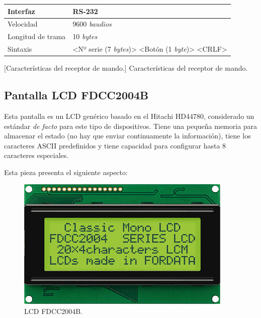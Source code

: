 \smallskip

\begin{center}
	\begin{tabular}{|l|l|}
		\hline Interfaz & RS-232 \\
		\hline Velocidad & 9600 \textit{baudios} \\ 
		\hline Longitud de trama & 10 \textit{bytes} \\ 
		\hline Sintaxis & <Nº serie (7 \textit{bytes})> <Botón (1 \textit{byte})> <CRLF> \\ 
		\hline 
	\end{tabular}
	\smallskip
	[Características del receptor de mando.]{\label{tab:info_recv} Características del receptor de mando. \cite{datasheet_decoder}}
\end{center}

\smallskip

\subsection{Pantalla LCD FDCC2004B}

Esta pantalla es un LCD genérico basado en el Hitachi HD44780, considerado un estándar \textit{de facto} para este tipo de dispositivos. Tiene una pequeña memoria para almacenar el estado (no hay que enviar continuamente la información), tiene los caracteres ASCII predefinidos y tiene capacidad para configurar hasta 8 caracteres especiales.

Esta pieza presenta el siguiente aspecto:

\smallskip

\begin{figure}[H]
	\noindent \begin{centering}
		\includegraphics[width=\linewidth/2]{capitulo3/FDCC2004B}
		\par\end{centering}
	\smallskip
	\caption{\label{fig:FDCC2004B} LCD FDCC2004B.}
\end{figure} 

